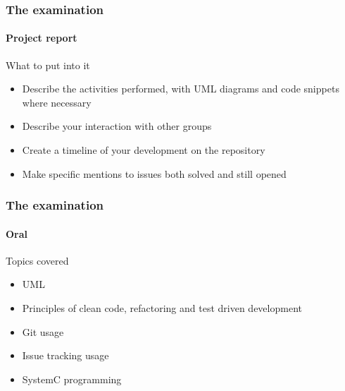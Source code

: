 \begin{frame}
\frametitle{The examination}
\framesubtitle{Project report}

\begin{block}{What to put into it}
\begin{itemize}
\item Describe the activities performed, with UML diagrams and code snippets where necessary
\item Describe your interaction with other groups
\item Create a timeline of your development on the repository
\item Make specific mentions to issues both solved and still opened
\end{itemize}
\end{block}

\end{frame}

\begin{frame}
\frametitle{The examination}
\framesubtitle{Oral}

\begin{block}{Topics covered}
\begin{itemize}
\item UML
\item Principles of clean code, refactoring and test driven development
\item Git usage
\item Issue tracking usage
\item SystemC programming
\end{itemize}
\end{block}

\end{frame}